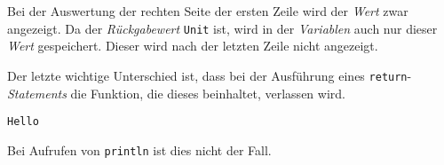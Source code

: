 \label{b54f391c-6428-4067-acdc-cbf77f7e2deb}
Bei der Auswertung der rechten Seite der ersten Zeile wird der
\emph{Wert} zwar angezeigt. Da der \emph{Rückgabewert} \texttt{Unit}
ist, wird in der \emph{Variablen} auch nur dieser \emph{Wert}
gespeichert. Dieser wird nach der letzten Zeile nicht angezeigt.

Der letzte wichtige Unterschied ist, dass bei der Ausführung eines
\texttt{return}-\emph{Statements} die Funktion, die dieses beinhaltet,
verlassen wird.

\label{2b8b6664-d1e5-453c-a90c-8bc1d388a77a}
\begin{Shaded}
\begin{Highlighting}[]
 \OperatorTok{():}  \OperatorTok{\{}
     
\OperatorTok{(}\OperatorTok{)}
\OperatorTok{\}}
\end{Highlighting}
\end{Shaded}

\label{e1084a90-ae96-4115-9622-1ed3db973db9}
\begin{Shaded}
\begin{Highlighting}[]
\OperatorTok{()}
\end{Highlighting}
\end{Shaded}

\begin{verbatim}
Hello
\end{verbatim}

\label{3ed10595-09ec-4081-87a5-f36ed69d0c33}
Bei Aufrufen von \texttt{println} ist dies nicht der Fall.

\label{c4503fb8-877d-4241-a84c-f5cfb258ec85}
\begin{Shaded}
\begin{Highlighting}[]
 \OperatorTok{()} \OperatorTok{:} \OperatorTok{\{}
\OperatorTok{(}\OperatorTok{)}
\OperatorTok{(}\OperatorTok{)}
\OperatorTok{\}}
\end{Highlighting}
\end{Shaded}

\label{c5b79448-bf94-4e05-82cc-2d72ef953d24}
\begin{Shaded}
\begin{Highlighting}[]
\OperatorTok{()}
\end{Highlighting}
\end{Shaded}

